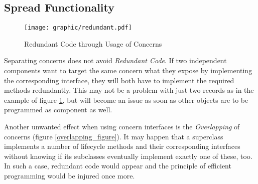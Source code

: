 %
%
%
%
%
%
%

\subsection{Spread Functionality}
\label{spread_functionality_heading}

\begin{figure}[ht]
    \begin{center}
        \texttt{[image: graphic/redundant.pdf]}
        \caption{Redundant Code through Usage of Concerns}
        \label{redundant_figure}
    \end{center}
\end{figure}

Separating concerns does not avoid \emph{Redundant Code}. If two independent
components want to target the same concern what they expose by implementing the
corresponding interface, they will both have to implement the required methods
redundantly. This may not be a problem with just two records as in the example
of figure \ref{redundant_figure}, but will become an issue as soon as other
objects are to be programmed as component as well.

Another unwanted effect when using concern interfaces is the \emph{Overlapping}
of concerns (figure \ref{overlapping_figure}). It may happen that a superclass
implements a number of lifecycle methods and their corresponding interfaces
without knowing if its subclasses eventually implement exactly one of these,
too. In such a case, redundant code would appear and the principle of efficient
programming would be injured once more.

